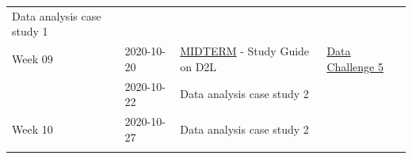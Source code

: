 \documentclass[
]{book}
\begin{document}
\begin{longtable}[]{@{}llll@{}}
\begin{minipage}[t]{0.22\columnwidth}
Data analysis case study 1\strut
\end{minipage} & \begin{minipage}[t]{0.22\columnwidth}\raggedright
\strut
\end{minipage}\tabularnewline
\begin{minipage}[t]{0.22\columnwidth}\raggedright
Week 09\strut
\end{minipage} & \begin{minipage}[t]{0.22\columnwidth}\raggedright
2020-10-20\strut
\end{minipage} & \begin{minipage}[t]{0.22\columnwidth}\raggedright
\href{https://classroom.github.com/a/7uCUExMy}{MIDTERM} - Study Guide on D2L\strut
\end{minipage} & \begin{minipage}[t]{0.22\columnwidth}\raggedright
\href{https://classroom.github.com/a/6eey650g}{Data Challenge 5}\strut
\end{minipage}\tabularnewline
\begin{minipage}[t]{0.22\columnwidth}\raggedright
\strut
\end{minipage} & \begin{minipage}[t]{0.22\columnwidth}\raggedright
2020-10-22\strut
\end{minipage} & \begin{minipage}[t]{0.22\columnwidth}\raggedright
Data analysis case study 2\strut
\end{minipage} & \begin{minipage}[t]{0.22\columnwidth}\raggedright
\strut
\end{minipage}\tabularnewline
\begin{minipage}[t]{0.22\columnwidth}\raggedright
Week 10\strut
\end{minipage} & \begin{minipage}[t]{0.22\columnwidth}\raggedright
2020-10-27\strut
\end{minipage} & \begin{minipage}[t]{0.22\columnwidth}\raggedright
Data analysis case study 2\strut
\end{minipage} & \begin{minipage}[t]{0.22\columnwidth}\raggedright
\strut
\end{minipage}\tabularnewline
\begin{minipage}[t]{0.22\columnwidth}\raggedright
\strut
\end{minipage} & \begin{minipage}[t]{0.22\columnwidth}\raggedright

\end{minipage}
\end{longtable}
\end{document}
